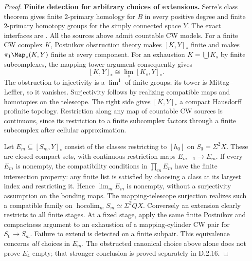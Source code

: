\begin{proof}
\medskip\noindent
\textbf{Finite detection for arbitrary choices of extensions.}
Serre's class theorem gives finite $2$-primary homology for $B$
in every positive degree and finite $2$-primary homotopy groups
for the simply connected space $Y$. The exact interfaces are
\cite[Chapter I, \S6.4; Chapter II, Proposition~8; Chapter III,
Theorem~1 and Corollaries~1--2, pp.~265, 271--274]{I_SerreClasses1953}.
All the sources above admit countable CW models. For a finite
CW complex $K$, Postnikov obstruction theory makes $[K,Y]_*$
finite and makes $\pi_1\Map_*(K,Y)$ finite at every component.
For an exhaustion $K=\bigcup K_s$ by finite subcomplexes,
the mapping-tower argument consequently gives
\[
 [K,Y]_*\cong\lim_s[K_s,Y]_*.
 \tag{D.2.13p}
\]
The obstruction to injectivity is a $\lim^1$ of finite groups;
its tower is Mittag--Leffler, so it vanishes. Surjectivity follows
by realizing compatible maps and homotopies on the telescope.
The right side gives $[K,Y]_*$ a compact Hausdorff profinite
topology. Restriction along any map of countable CW sources is
continuous, since its restriction to a finite subcomplex factors
through a finite subcomplex after cellular approximation.

Let $E_m\subseteq[S_m,Y]_*$ consist of the classes restricting
to $[h_0]$ on $S_0=\Sigma^2X$. These are closed compact sets, with
continuous restriction maps $E_{m+1}\to E_m$. If every $E_m$
is nonempty, the compatibility conditions in $\prod_mE_m$ have
the finite intersection property: any finite list is satisfied
by choosing a class at its largest index and restricting it.
Hence $\lim_mE_m$ is nonempty, without a surjectivity assumption
on the bonding maps. The mapping-telescope surjection realizes
such a compatible family on
$\operatorname{hocolim}_mS_m\simeq\Sigma^2QX$.
Conversely an extension clearly restricts to all finite stages.
At a fixed stage, apply the same finite Postnikov and compactness
argument to an exhaustion of a mapping-cylinder CW pair for
$S_0\to S_m$. Failure to extend is detected on a finite subpair.
This equivalence concerns \emph{all} choices in $E_m$. The
obstructed canonical choice above alone does not prove $E_4$ empty;
that stronger conclusion is proved separately in D.2.16.
\end{proof}
